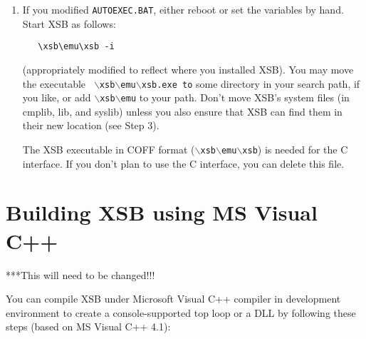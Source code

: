 \begin{enumerate}
\item 
   If you modified {\tt AUTOEXEC.BAT}, either reboot or set the variables
   by hand.  Start XSB as follows:
\begin{verbatim}
   \xsb\emu\xsb -i
\end{verbatim}
   (appropriately modified to reflect where you installed XSB).  You
   may move the executable {\tt
   $\backslash$xsb$\backslash$emu$\backslash$xsb.exe to} some directory in
   your search path, if you like, or add {\tt $\backslash$xsb$\backslash$emu}
   to your path.  Don't move XSB's system files (in cmplib, lib, and
   syslib) unless you also ensure that XSB can find them in their new
   location (see Step 3).

   The XSB executable in COFF format
   ({\tt $\backslash$xsb$\backslash$emu$\backslash$xsb}) is needed for the C
   interface.  If you don't plan to use the C interface, you can
   delete this file.
\end{enumerate}


\section{Building XSB using MS Visual C++}

***This will need to be changed!!!

You can compile XSB under Microsoft Visual C++ compiler in development
environment to create a console-supported top loop or a DLL by following
these steps (based on MS Visual C++ 4.1):

